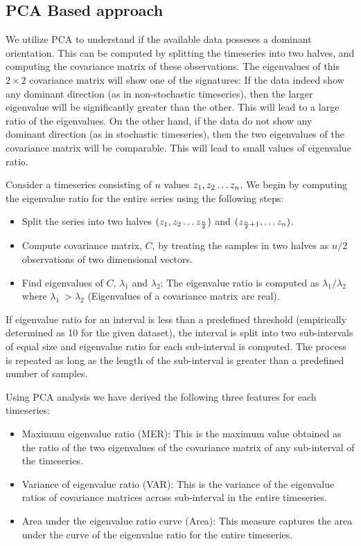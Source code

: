 \documentclass[10pt,conference]{IEEEtran}
\begin{document}
\subsection{PCA Based approach}
We utilize PCA to understand if the available data posseses a dominant orientation. This can be computed by splitting the timeseries into two halves, and computing the covariance matrix of these observations. The eigenvalues of this $2 \times 2$ covariance matrix will show one of the signatures: If the data indeed show any dominant direction (as in non-stochastic timeseries), then the larger eigenvalue will be significantly greater than the other. This will lead to a large ratio of the eigenvalues. On the other hand, if the data do not show any dominant direction (as in stochastic timeseries), then the two eigenvalues of the covariance matrix will be comparable. This will lead to small values of eigenvalue ratio.

Consider a timeseries consisting of $n$ values  $z_1, z_2 \mathellipsis z_n$. We begin by computing the eigenvalue ratio for the entire series using the following steps:
\begin{itemize}
  \item  Split the series into two halves $(z_1, z_2 \mathellipsis z_{\frac{n}{2}})$ and $(z_{\frac{n}{2} + 1}, \mathellipsis z_n)$.
  \item Compute covariance matrix, $C$,  by treating the samples in two halves as $n/2$ observations of two dimensional vectors.
  \item Find eigenvalues of $C$, $\lambda_1$ and $\lambda_2$; The eigenvalue ratio is computed as  $\lambda_1/\lambda_2$ where $\lambda_1 \ > \lambda_2$ (Eigenvalues of a covariance matrix are real).
\end{itemize}
If eigenvalue ratio for an interval is less than a predefined threshold (empirically determined as 10 for the given dataset), the interval is split into two sub-intervals of equal size and eigenvalue ratio for each sub-interval is computed. The process is repeated as long as the length of the sub-interval is greater than a predefined number of samples.

Using PCA analysis we have derived the following three features for each timeseries:
\begin{itemize}
  \item Maximum eigenvalue ratio (MER): This is the maximum value obtained as the ratio of the two eigenvalues of the covariance matrix of any sub-interval of the timeseries.
  \item Variance of eigenvalue ratio (VAR): This is the variance of the eigenvalue ratios of covariance matrices across sub-interval in the entire timeseries.
  \item Area under the eigenvalue ratio curve (Area): This measure captures the area under the curve of the eigenvalue ratio for the entire timeseries.
\end{itemize}
\end{document}
